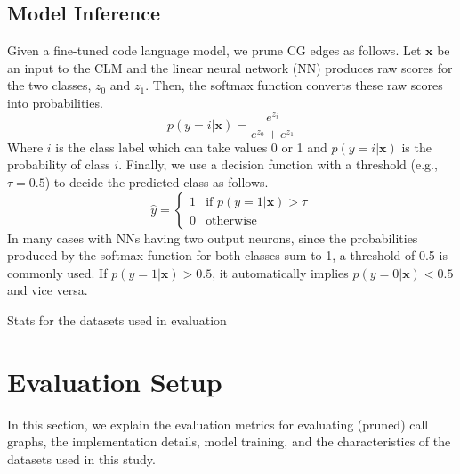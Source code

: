 \subsection{Model Inference}\label{ch1:subsec:model-inf}
Given a fine-tuned code language model, we prune CG edges as follows. Let \( \mathbf{x} \) be an input to the CLM and the linear neural network (NN) produces raw scores for the two classes, \( z_0 \) and \( z_1 \). Then, the softmax function converts these raw scores into probabilities.%
\begin{equation}
p(y = i | \mathbf{x}) = \frac{e^{z_i}}{e^{z_0} + e^{z_1}}
\end{equation}
Where \( i \) is the class label which can take values 0 or 1 and $p(y = i | \mathbf{x})$ is the probability of class $i$. Finally, we use a decision function with a threshold (e.g., \( \tau = 0.5 \)) to decide the predicted class as follows.
\begin{equation}\label{eq:decision_func}
\hat{y} = 
\begin{cases} 
1 & \text{if } p(y = 1 | \mathbf{x}) > \tau \\
0 & \text{otherwise}
\end{cases}
\end{equation}
In many cases with NNs having two output neurons, since the probabilities produced by the softmax function for both classes sum to 1, a threshold of 0.5 is commonly used. If \( p(y = 1 | \mathbf{x}) > 0.5 \), it automatically implies \( p(y = 0 | \mathbf{x}) < 0.5 \) and vice versa.

\begin{table}
\centering
\caption{Stats for the datasets used in evaluation}
\label{ch1:tab:data-stats}
\small

\end{table}

\newpage
\section{Evaluation Setup}\label{ch1:sec:eval-setup}
In this section, we explain the evaluation metrics for evaluating (pruned) call graphs, the implementation details, model training, and the characteristics of the datasets used in this study. 

